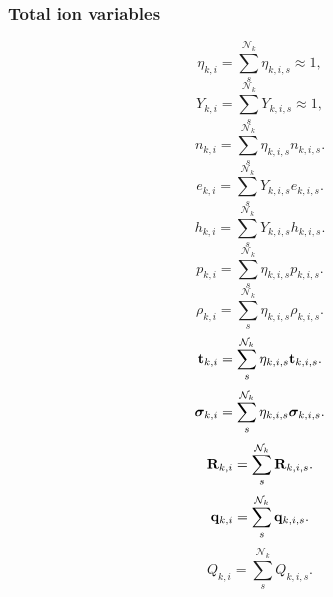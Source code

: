 \documentclass[a4paper,11pt]{report}
\begin{document}
\subsubsection{Total ion variables}

\begin{equation}
    \label{eq:sf_vars_eta_ki}
    \eta_{k,i} = \sum_s^{\mathcal{N}_k} \eta_{k,i,s} \approx 1, 
\end{equation}
\begin{equation}
    \label{eq:sf_vars_Y_ki}
    Y_{k,i} = \sum_s^{\mathcal{N}_k} Y_{k,i,s} \approx 1, 
\end{equation}
\begin{equation}
    \label{eq:sf_vars_n_ki}
    n_{k,i} = \sum_s^{\mathcal{N}_k} \eta_{k,i,s} n_{k,i,s}. 
\end{equation}
\begin{equation}
    e_{k,i} = \sum_s^{\mathcal{N}_k} Y_{k,i,s} e_{k,i,s}.
\end{equation}
\begin{equation}
    h_{k,i} = \sum_s^{\mathcal{N}_k} Y_{k,i,s} h_{k,i,s}.
\end{equation}
\begin{equation}
    \label{eq:sf_vars_p_ki}
    p_{k,i} = \sum_s^{\mathcal{N}_k} \eta_{k,i,s} p_{k,i,s}.
\end{equation}
\begin{equation}
    \label{eq:sf_vars_rho_ki}
    \rho_{k,i} = \sum_s^{\mathcal{N}_k} \eta_{k,i,s} \rho_{k,i,s}.
\end{equation}
\begin{equation}
    \label{eq:sf_vars_t_ki}
    \mathbf{t}_{k,i} = \sum_s^{\mathcal{N}_k} \eta_{k,i,s} \mathbf{t}_{k,i,s}.
\end{equation}
\begin{equation}
    \label{eq:sf_vars_sig_ki}
    \bm \sigma_{k,i} = \sum_s^{\mathcal{N}_k} \eta_{k,i,s} \bm \sigma_{k,i,s}.
\end{equation}
\begin{equation}
    \label{eq:sf_vars_R_ki}
    \mathbf{R}_{k,i} = \sum_s^{\mathcal{N}_k} \mathbf{R}_{k,i,s}.
\end{equation}
\begin{equation}
    \label{eq:sf_vars_q_ki}
    \mathbf{q}_{k,i} = \sum_s^{\mathcal{N}_k} \mathbf{q}_{k,i,s}.
\end{equation}
\begin{equation}
    \label{eq:sf_vars_Q_ki}
    Q_{k,i} = \sum_s^{\mathcal{N}_k} Q_{k,i,s}.
\end{equation}
\end{document}

